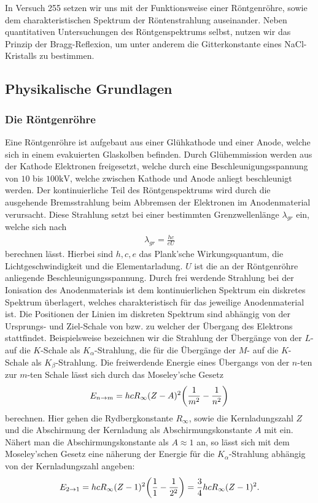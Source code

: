 In Versuch 255 setzen wir uns mit der Funktionsweise einer Röntgenröhre, sowie dem charakteristischen Spektrum der Röntenstrahlung auseinander. Neben quantitativen Untersuchungen des Röntgenspektrums selbst, nutzen wir das Prinzip der Bragg-Reflexion, um unter anderem die Gitterkonstante eines NaCl-Kristalls zu bestimmen.

\subsection{Physikalische Grundlagen}

\subsubsection*{Die Röntgenröhre}
Eine Röntgenröhre ist aufgebaut aus einer Glühkathode und einer Anode, welche sich in einem evakuierten Glaskolben befinden. Durch Glühemmission werden aus der Kathode Elektronen freigesetzt, welche durch eine Beschleunigungsspannung von $10$ bis $100\si{\kilo\volt}$, welche zwischen Kathode und Anode anliegt beschleunigt werden. Der kontinuierliche Teil des Röntgenspektrums wird durch die ausgehende Bremsstrahlung beim Abbremsen der Elektronen im Anodenmaterial verursacht. Diese Strahlung setzt bei einer bestimmten Grenzwellenlänge $\lambda_{gr}$ ein, welche sich nach
\begin{align}
  \lambda_{gr} = \frac{hc}{eU}
\end{align}
berechnen lässt. Hierbei sind $h,c,e$ das Plank'sche Wirkungsquantum, die Lichtgeschwindigkeit und die Elementarladung. $U$ ist die an der Röntgenröhre anliegende Beschleunigungsspannung. Durch frei werdende Strahlung bei der Ionisation des Anodenmaterials ist dem kontinuierlichen Spektrum ein diskretes Spektrum überlagert, welches charakteristisch für das jeweilige Anodenmaterial ist. Die Positionen der Linien im diskreten Spektrum sind abhängig von der Ursprungs- und Ziel-Schale von bzw. zu welcher der Übergang des Elektrons stattfindet. Beispielsweise bezeichnen wir die Strahlung der Übergänge von der $L$- auf die $K$-Schale als $K_{\alpha}$-Strahlung, die für die Übergänge der $M$- auf die $K$-Schale als $K_{\beta}$-Strahlung. Die freiwerdende Energie eines Übergangs von der $n$-ten zur $m$-ten Schale lässt sich durch das Moseley'sche Gesetz
\begin{align}
  E_{n\to m} = hc R_{\infty} (Z-A)^2 \qty(\frac{1}{m^2} - \frac{1}{n^2})
\end{align}
berechnen. Hier gehen die Rydbergkonstante $R_{\infty}$, sowie die Kernladungszahl $Z$ und die Abschirmung der Kernladung als Abschirmungskonstante $A$ mit ein. Nähert man die Abschirmungskonstante als $A \approx 1$ an, so lässt sich mit dem Moseley'schen Gesetz eine näherung der Energie für die $K_{\alpha}$-Strahlung abhängig von der Kernladungszahl angeben:
\begin{align}
  E_{2 \to 1} = hc R_{\infty} (Z - 1)^2 \qty(\frac{1}{1}- \frac{1}{2^2}) = \frac{3}{4} hc R_{\infty} (Z - 1)^2.
\end{align}

